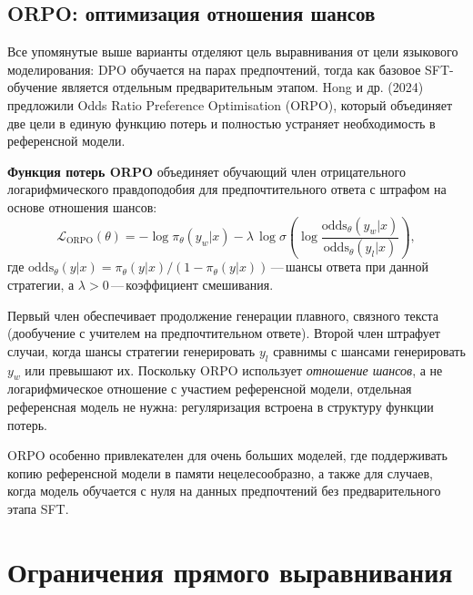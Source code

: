 \subsection{ORPO: оптимизация отношения шансов}

Все упомянутые выше варианты отделяют цель выравнивания от цели языкового моделирования: DPO обучается на парах предпочтений, тогда как базовое SFT-обучение является отдельным предварительным этапом. Hong и др. (2024) предложили Odds Ratio Preference Optimisation (ORPO), который объединяет две цели в единую функцию потерь и полностью устраняет необходимость в референсной модели.

\begin{definition}
\label{def:orpo-loss}
\textbf{Функция потерь ORPO} объединяет обучающий член отрицательного логарифмического правдоподобия для предпочтительного ответа с штрафом на основе отношения шансов:
\begin{equation}
\label{eq:orpo-loss}
\mathcal{L}_\mathrm{ORPO}(\theta)
= -\log\pi_\theta(y_w|x)
- \lambda\,\log\sigma\!\left(\log\frac{\mathrm{odds}_\theta(y_w|x)}{\mathrm{odds}_\theta(y_l|x)}\right),
\end{equation}
где $\mathrm{odds}_\theta(y|x) = \pi_\theta(y|x) / (1 - \pi_\theta(y|x))$\,---\,шансы ответа при данной стратегии, а $\lambda > 0$\,---\,коэффициент смешивания.
\end{definition}

Первый член обеспечивает продолжение генерации плавного, связного текста (дообучение с учителем на предпочтительном ответе). Второй член штрафует случаи, когда шансы стратегии генерировать $y_l$ сравнимы с шансами генерировать $y_w$ или превышают их. Поскольку ORPO использует \emph{отношение шансов}, а не логарифмическое отношение с участием референсной модели, отдельная референсная модель не нужна: регуляризация встроена в структуру функции потерь.

ORPO особенно привлекателен для очень больших моделей, где поддерживать копию референсной модели в памяти нецелесообразно, а также для случаев, когда модель обучается с нуля на данных предпочтений без предварительного этапа SFT.

\section{Ограничения прямого выравнивания}
\label{sec:dpo-limitations}

